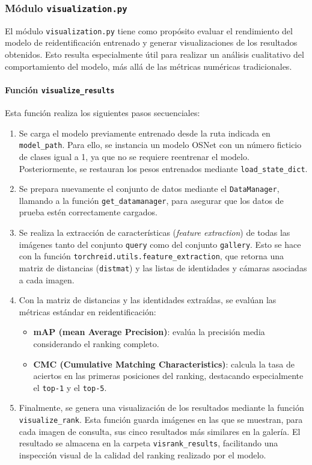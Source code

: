 \documentclass[12pt, a4paper, twoside]{article}
\begin{document}
	\subsubsection{Módulo \texttt{visualization.py}}
	
	El módulo \texttt{visualization.py} tiene como propósito evaluar el rendimiento del modelo de reidentificación entrenado y generar visualizaciones de los resultados obtenidos. Esto resulta especialmente útil para realizar un análisis cualitativo del comportamiento del modelo, más allá de las métricas numéricas tradicionales.
	
	\paragraph{Función \texttt{visualize\_results}}
	
	Esta función realiza los siguientes pasos secuenciales:
	
	\begin{enumerate}
		\item Se carga el modelo previamente entrenado desde la ruta indicada en \texttt{model\_path}. Para ello, se instancia un modelo OSNet con un número ficticio de clases igual a 1, ya que no se requiere reentrenar el modelo. Posteriormente, se restauran los pesos entrenados mediante \texttt{load\_state\_dict}.
		
		\item Se prepara nuevamente el conjunto de datos mediante el \texttt{DataManager}, llamando a la función \texttt{get\_datamanager}, para asegurar que los datos de prueba estén correctamente cargados.
		
		\item Se realiza la extracción de características (\textit{feature extraction}) de todas las imágenes tanto del conjunto \texttt{query} como del conjunto \texttt{gallery}. Esto se hace con la función \texttt{torchreid.utils.feature\_extraction}, que retorna una matriz de distancias (\texttt{distmat}) y las listas de identidades y cámaras asociadas a cada imagen.
		
		\item Con la matriz de distancias y las identidades extraídas, se evalúan las métricas estándar en reidentificación:
		\begin{itemize}
			\item \textbf{mAP (mean Average Precision)}: evalúa la precisión media considerando el ranking completo.
			\item \textbf{CMC (Cumulative Matching Characteristics)}: calcula la tasa de aciertos en las primeras posiciones del ranking, destacando especialmente el \texttt{top-1} y el \texttt{top-5}.
		\end{itemize}
		
		\item Finalmente, se genera una visualización de los resultados mediante la función \texttt{visualize\_rank}. Esta función guarda imágenes en las que se muestran, para cada imagen de consulta, sus cinco resultados más similares en la galería. El resultado se almacena en la carpeta \texttt{visrank\_results}, facilitando una inspección visual de la calidad del ranking realizado por el modelo.
	\end{enumerate}
	
\end{document}
